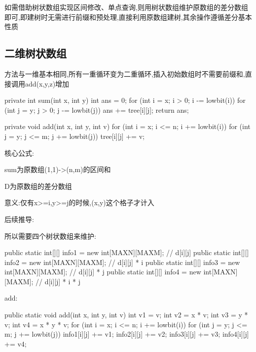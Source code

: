 \documentclass[UTF8,a4paper,11pt]{ctexart}
\newcommand{\topic}[1]{%
  \par\needspace{3\baselineskip}\vspace{0.45em}%
  \noindent{\bfseries\color{Primary}#1}\par\vspace{0.12em}%
}
\begin{document}
如需借助树状数组实现区间修改、单点查询,则用树状数组维护原数组的差分数组即可,即建树时无需进行前缀和预处理,直接利用原数组建树,其余操作遵循差分基本性质

\subsection{二维树状数组}

\topic{单点修改与范围查询}

方法与一维基本相同,所有一重循环变为二重循环,插入初始数组时不需要前缀和,直接调用add(x,y,z)增加

\begin{CodeBlock}
private int sum(int x, int y) {
    int ans = 0;
    for (int i = x; i > 0; i -= lowbit(i))
        for (int j = y; j > 0; j -= lowbit(j))
            ans += tree[i][j];
    return ans;
}
\end{CodeBlock}

\begin{CodeBlock}
private void add(int x, int y, int v) {
    for (int i = x; i <= n; i += lowbit(i))
        for (int j = y; j <= m; j += lowbit(j))
            tree[i][j] += v;
}
\end{CodeBlock}

\topic{范围修改与范围查询}

核心公式:

\begin{CodeBlock}
sum为原数组(1,1)->(n,m)的区间和
\end{CodeBlock}

D为原数组的差分数组

意义:仅有x>=i,y>=j的时候,(x,y)这个格子才计入

后续推导:

所以需要四个树状数组来维护:

\begin{CodeBlock}
public static int[][] info1 = new int[MAXN][MAXM]; // d[i][j]
public static int[][] info2 = new int[MAXN][MAXM]; // d[i][j] * i
public static int[][] info3 = new int[MAXN][MAXM]; // d[i][j] * j
public static int[][] info4 = new int[MAXN][MAXM]; // d[i][j] * i * j
\end{CodeBlock}

add:

\begin{CodeBlock}
public static void add(int x, int y, int v) {
    int v1 = v;
    int v2 = x * v;
    int v3 = y * v;
    int v4 = x * y * v;
    for (int i = x; i <= n; i += lowbit(i)) {
        for (int j = y; j <= m; j += lowbit(j)) {
            info1[i][j] += v1;
            info2[i][j] += v2;
            info3[i][j] += v3;
            info4[i][j] += v4;
        }
    }
}
\end{CodeBlock}
\end{document}
